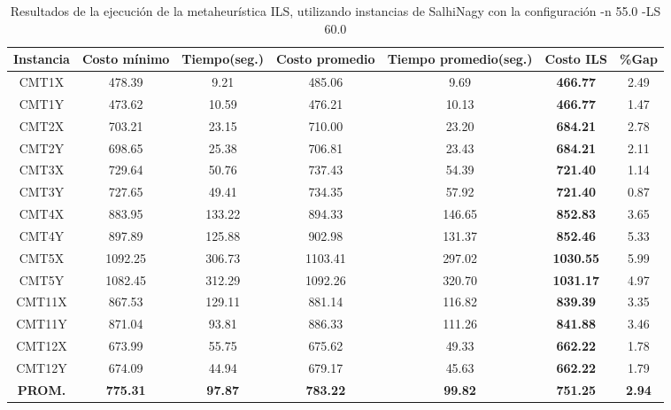 \begin{table}[ht]
\caption{Resultados de la ejecución de la metaheurística ILS, utilizando instancias de SalhiNagy con la configuración -n 55.0 -LS 60.0}
\centering
\small
\begin{tabular}{c c c c c c c}
\hline\hline
Instancia & Costo mínimo & Tiempo(seg.) & Costo promedio & Tiempo promedio(seg.) & Costo ILS & \%Gap \\ [0.5ex]
\hline
CMT1X & 478.39 & 9.21 & 
485.06 & 9.69 & \bf{466.77} & 
2.49\\CMT1Y & 473.62 & 10.59 & 
476.21 & 10.13 & \bf{466.77} & 
1.47\\CMT2X & 703.21 & 23.15 & 
710.00 & 23.20 & \bf{684.21} & 
2.78\\CMT2Y & 698.65 & 25.38 & 
706.81 & 23.43 & \bf{684.21} & 
2.11\\CMT3X & 729.64 & 50.76 & 
737.43 & 54.39 & \bf{721.40} & 
1.14\\CMT3Y & 727.65 & 49.41 & 
734.35 & 57.92 & \bf{721.40} & 
0.87\\CMT4X & 883.95 & 133.22 & 
894.33 & 146.65 & \bf{852.83} & 
3.65\\CMT4Y & 897.89 & 125.88 & 
902.98 & 131.37 & \bf{852.46} & 
5.33\\CMT5X & 1092.25 & 306.73 & 
1103.41 & 297.02 & \bf{1030.55} & 
5.99\\CMT5Y & 1082.45 & 312.29 & 
1092.26 & 320.70 & \bf{1031.17} & 
4.97\\CMT11X & 867.53 & 129.11 & 
881.14 & 116.82 & \bf{839.39} & 
3.35\\CMT11Y & 871.04 & 93.81 & 
886.33 & 111.26 & \bf{841.88} & 
3.46\\CMT12X & 673.99 & 55.75 & 
675.62 & 49.33 & \bf{662.22} & 
1.78\\CMT12Y & 674.09 & 44.94 & 
679.17 & 45.63 & \bf{662.22} & 
1.79\\\bf{PROM.} & 
\bf{775.31} & \bf{97.87} & \bf{783.22} & \bf{99.82} & \bf{751.25} & \bf{2.94}\\[1ex]\hline
\end{tabular}
\label{table:nonlin}
\end{table} \clearpage
